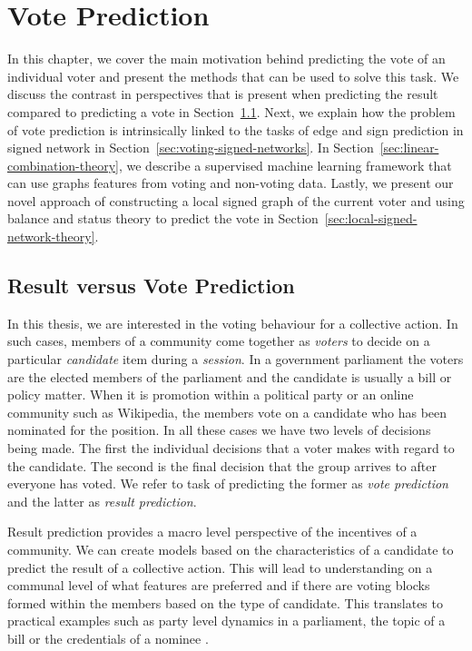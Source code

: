 \chapter{Vote Prediction}
\label{chp:vote-prediction}
In this chapter, we cover the main motivation behind predicting the vote of an individual voter and present the methods that can be used to solve this task.
We discuss the contrast in perspectives that is present when predicting the result compared to predicting a vote in Section~\ref{sec:result-vs-vote}.
Next, we explain how the problem of vote prediction is intrinsically linked to the tasks of edge and sign prediction in signed network in Section~\ref{sec:voting-signed-networks}.
In Section~\ref{sec:linear-combination-theory}, we describe a supervised machine learning framework that can use graphs features from voting and non-voting data.
Lastly, we present our novel approach of constructing a local signed graph of the current voter and using balance and status theory to predict the vote in Section~\ref{sec:local-signed-network-theory}. 


\section{Result versus Vote Prediction}
\label{sec:result-vs-vote}
In this thesis, we are interested in the voting behaviour for a collective action.
In such cases, members of a community come together as \textit{voters} to decide on a particular \textit{candidate} item during a \textit{session}.
In a government parliament  the voters are the elected members of the parliament and the candidate is usually a bill or policy matter.
When it is promotion within a political party or an online community such as Wikipedia, the members vote on a candidate who has been nominated for the position.
In all these cases we have two levels of decisions being made.
The first the individual decisions that a voter makes with regard to the candidate.
The second is the final decision that the group arrives to after everyone has voted.
We refer to task of predicting the former as \textit{vote prediction} and the latter as \textit{result prediction}. 

Result prediction provides a macro level perspective of the incentives of a community.
We can create models based on the characteristics of a candidate to predict the result of a collective action.
This will lead to understanding on a communal level of what features are preferred and if there are voting blocks formed within the members based on the type of candidate.
This translates to practical examples such as party level dynamics in a parliament, the topic of a bill or the credentials of a nominee \cite{burke2008mopping,yano2012textual,yogatama-etal-2011-predicting}. 

